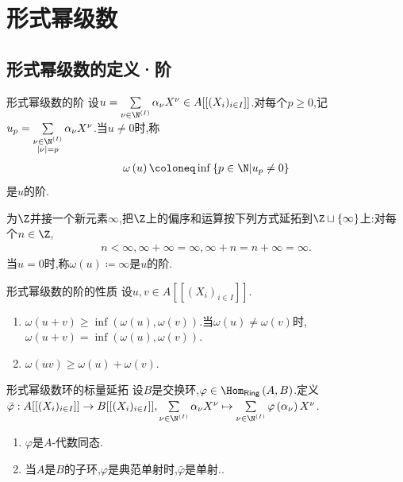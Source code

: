 \chapter{形式幂级数}

\section{形式幂级数的定义·阶}

\begin{definition}{形式幂级数的阶}{}
	设$u=\sum\limits_{\nu\in\N^{\left(I\right)}}\alpha_{\nu}X^{\nu}\in A[[(X_{i})_{i\in I}]]$.对每个$p\geq 0$,记$u_{p}=\sum\limits_{\substack{\nu\in\N^{\left(I\right)}\\ \left|\nu\right|=p}}\alpha_{\nu}X^{\nu}$.当$u\neq 0$时,称
	\begin{align*}
		\omega\left(u\right)\coloneq\inf\left\{p\in\N\middle|u_{p}\neq 0\right\}
	\end{align*}
	是$u$的阶.
\end{definition}

\begin{remark}{}{}
	为$\Z$并接一个新元素$\infty$,把$\Z$上的偏序和运算按下列方式延拓到$\Z\sqcup\left\{\infty\right\}$上:对每个$n\in\Z$,
	\begin{align*}
		n<\infty,\infty+\infty=\infty,\infty+n=n+\infty=\infty.
	\end{align*}
	当$u=0$时,称$\omega\left(u\right)\coloneq\infty$是$u$的阶.
\end{remark}

\begin{proposition}{形式幂级数的阶的性质}{}
	设$u,v\in A[[(X_{i})_{i\in I}]]$.
	\begin{enumerate}
		\item $\omega\left(u+v\right)\geq\inf\left(\omega\left(u\right),\omega\left(v\right)\right)$.当$\omega\left(u\right)\neq\omega\left(v\right)$时,$\omega\left(u+v\right)=\inf\left(\omega\left(u\right),\omega\left(v\right)\right)$.
		\item $\omega\left(uv\right)\geq\omega\left(u\right)+\omega\left(v\right)$.
	\end{enumerate}
\end{proposition}

\begin{proposition}{形式幂级数环的标量延拓}{}
	设$B$是交换环,$\varphi\in\Hom_{\mathsf{Ring}}\left(A,B\right)$.定义$\bar{\varphi}:A[[(X_{i})_{i\in I}]]\to B[[(X_{i})_{i\in I}]],\sum\limits_{\nu\in\N^{\left(I\right)}}\alpha_{\nu}X^{\nu}\mapsto\sum\limits_{\nu\in\N^{\left(I\right)}}\varphi\left(\alpha_{\nu}\right)X^{\nu}$.
	\begin{enumerate}
		\item $\varphi$是$A$-代数同态.
		\item 当$A$是$B$的子环,$\varphi$是典范单射时,$\bar{\varphi}$是单射..
	\end{enumerate}
\end{proposition}

